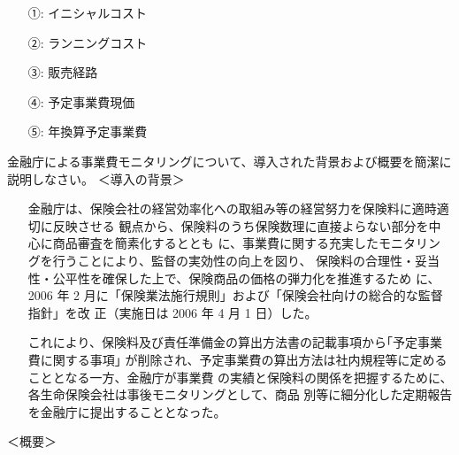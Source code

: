 \documentclass[report,gutter=10mm,fore-edge=10mm,uplatex,dvipdfmx]{jlreq}
\begin{document}
\answer{}
\begin{itemize}
\item[ ①: ]  イニシャルコスト
\item[ ②: ]  ランニングコスト
\item[ ③: ]  販売経路
\item[ ④: ]  予定事業費現価
\item[ ⑤: ]  年換算予定事業費
\end{itemize}

金融庁による事業費モニタリングについて、導入された背景および概要を簡潔に説明しなさい。
\answer{}
＜導入の背景＞
\begin{itemize}
 \item[] 金融庁は、保険会社の経営効率化への取組み等の経営努力を保険料に適時適切に反映させる
 観点から、保険料のうち保険数理に直接よらない部分を中心に商品審査を簡素化するととも
 に、事業費に関する充実したモニタリングを行うことにより、監督の実効性の向上を図り、
 保険料の合理性・妥当性・公平性を確保した上で、保険商品の価格の弾力化を推進するため
 に、2006 年 2 月に「保険業法施行規則」および「保険会社向けの総合的な監督指針」を改
 正（実施日は 2006 年 4 月 1 日）した。
 \item[] これにより、保険料及び責任準備金の算出方法書の記載事項から｢予定事業費に関する事項｣
 が削除され、予定事業費の算出方法は社内規程等に定めることとなる一方、金融庁が事業費
 の実績と保険料の関係を把握するために、各生命保険会社は事後モニタリングとして、商品
 別等に細分化した定期報告を金融庁に提出することとなった。
\end{itemize}
＜概要＞
\end{document}
